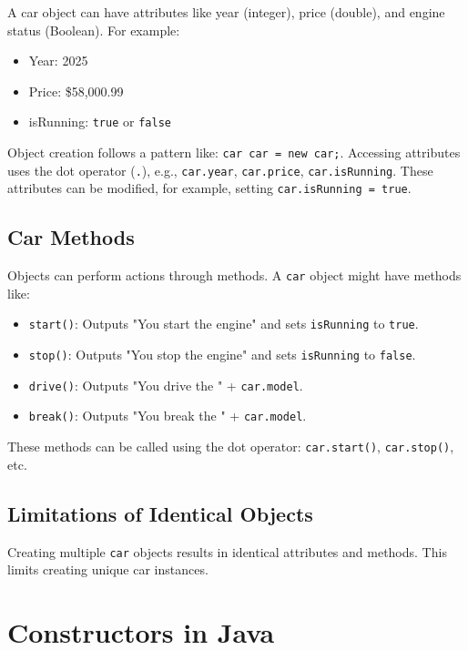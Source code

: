 \documentclass{article}
\begin{document}
A car object can have attributes like year (integer), price (double), and engine status (Boolean).  For example:

\begin{itemize}
    \item Year: 2025
    \item Price: \$58,000.99
    \item isRunning: \texttt{true} or \texttt{false}
\end{itemize}

Object creation follows a pattern like:  \texttt{car car = new car;}.  Accessing attributes uses the dot operator (\texttt{.}), e.g., \texttt{car.year}, \texttt{car.price}, \texttt{car.isRunning}.  These attributes can be modified, for example, setting \texttt{car.isRunning = true}.


\subsection{Car Methods}

Objects can perform actions through methods.  A \texttt{car} object might have methods like:

\begin{itemize}
    \item \texttt{start()}: Outputs "You start the engine" and sets \texttt{isRunning} to \texttt{true}.
    \item \texttt{stop()}: Outputs "You stop the engine" and sets \texttt{isRunning} to \texttt{false}.
    \item \texttt{drive()}: Outputs "You drive the " + \texttt{car.model}.
    \item \texttt{break()}: Outputs "You break the " + \texttt{car.model}.
\end{itemize}

These methods can be called using the dot operator: \texttt{car.start()}, \texttt{car.stop()}, etc.


\subsection{Limitations of Identical Objects}

Creating multiple \texttt{car} objects results in identical attributes and methods.  This limits creating unique car instances.


\section{Constructors in Java}
\end{document}
